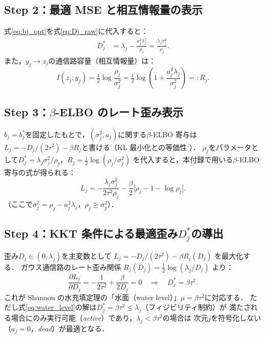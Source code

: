 \documentclass[11pt,a4paper]{jsarticle}
\begin{document}
\subsection*{Step 2：最適 MSE と相互情報量の表示}

式\eqref{eq:bj_opt}を式\eqref{eq:Dj_raw}に代入すると：
\begin{align}
  D_j^* &= \lambda_j - \frac{a_j^2 \lambda_j^2}{\rho_j}
          = \frac{\lambda_j \sigma_j^2}{\rho_j}.
  \label{eq:Dj_opt}
\end{align}
また，$y_j \to z_j$の通信路容量（相互情報量）は：
\begin{equation}
  I(z_j; y_j) = \tfrac{1}{2}\log\frac{\rho_j}{\sigma_j^2}
              = \tfrac{1}{2}\log\!\left(1 + \frac{a_j^2 \lambda_j}{\sigma_j^2}\right)
              =: R_j.
  \label{eq:Rj}
\end{equation}

\subsection*{Step 3：$\beta$-ELBO のレート歪み表示}

$b_j = b_j^*$を固定したもとで，$(\sigma_j^2, a_j)$に関する$\beta$-ELBO 寄与は
$L_j = -D_j/(2\tau^2) - \beta R_j$と書ける（KL 最小化との等価性 \cite{cover2006elements}）．
$\rho_j$をパラメータとして$D_j^* = \lambda_j \sigma_j^2/\rho_j$，$R_j = \tfrac{1}{2}\log(\rho_j/\sigma_j^2)$
を代入すると，本付録で用いる$\beta$-ELBO 寄与の式が得られる：
\begin{equation}
  L_j = -\frac{\lambda_j \sigma_j^2}{2\tau^2 \rho_j}
        - \frac{\beta}{2}\bigl[\rho_j - 1 - \log \rho_j\bigr].
  \label{eq:elbo_j}
\end{equation}
（ここで$\sigma_j^2 = \rho_j - a_j^2\lambda_j$，$\rho_j \geq \sigma_j^2$）．

\subsection*{Step 4：KKT 条件による最適歪み$D_j^*$の導出}

歪み$D_j \in (0, \lambda_j)$を主変数として $L_j = -D_j/(2\tau^2) - \beta R_j(D_j)$ を最大化する．
ガウス通信路のレート歪み関係 $R_j(D_j) = \tfrac{1}{2}\log(\lambda_j / D_j)$ より：
\begin{equation}
  \frac{\partial L_j}{\partial D_j}
  = -\frac{1}{2\tau^2} + \frac{\beta}{2 D_j} = 0
  \quad\Longrightarrow\quad
  D_j^{*} = \beta \tau^2.
  \label{eq:water_level}
\end{equation}
これが Shannon の水充填定理\cite{cover2006elements}の「水面（water level）」$\mu = \beta\tau^2$に対応する．
ただし式\eqref{eq:water_level}の解は$D_j^* = \beta\tau^2 \leq \lambda_j$（フィジビリティ制約）が
満たされる場合にのみ実行可能（\textit{active}）であり，$\lambda_j < \beta\tau^2$の場合は
次元$j$を符号化しない（$a_j = 0$，\textit{dead}）が最適となる．
\end{document}
